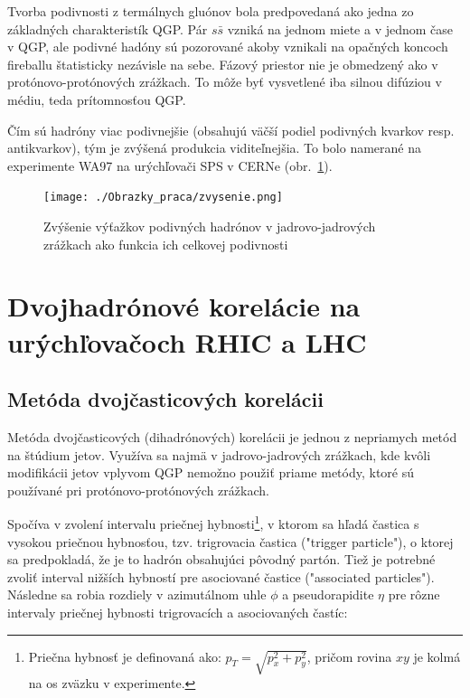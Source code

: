 \documentclass[thesismargins, thesislinespacing]{rnthesis}
\begin{document}
Tvorba podivnosti z termálnych gluónov bola predpovedaná ako jedna zo \-zák\-lad\-ných charakteristík QGP. Pár $s \bar{s}$ vzniká na jednom miete a v jednom čase v QGP, ale podivné hadóny sú pozorované akoby vznikali na opačných koncoch fireballu štatisticky nezávisle na sebe. Fázový priestor nie je obmedzený ako v protónovo-protónových zrážkach. To môže byť vysvetlené iba silnou difúziou v médiu, teda prítomnosťou QGP.

Čím sú hadróny viac podivnejšie (obsahujú väčší podiel podivných kvarkov resp. antikvarkov), tým je zvýšená produkcia viditeľnejšia. To bolo namerané na experimente WA97 na urýchľovači SPS v CERNe (obr.~\ref{zvysenie}).


\begin{figure}[hbtp!]
	\begin{center}
		\texttt{[image: ./Obrazky\_praca/zvysenie.png]}
		\caption{ Zvýšenie výťažkov podivných hadrónov v jadrovo-jadrových zrážkach ako funkcia ich celkovej podivnosti \cite{zvysenie}}
		\label{zvysenie}
	\end{center}
\end{figure}  



\chapter{Dvojhadrónové korelácie na urýchľovačoch RHIC a LHC}

\section{Metóda dvojčasticových korelácii}
Metóda dvojčasticových (dihadrónových) korelácii je jednou z nepriamych metód na štúdium jetov. Využíva sa najmä v jadrovo-jadrových zrážkach, kde kvôli \-mo\-di\-fi\-ká\-cii jetov vplyvom QGP nemožno použiť priame metódy, ktoré sú používané pri protónovo-protónových zrážkach.

Spočíva v zvolení intervalu priečnej hybnosti\footnote{Priečna hybnosť je definovaná ako: $p_T=\sqrt{p_x^2+p_y^2}$, pričom rovina $xy$ je kolmá na os zväzku v experimente.}, v ktorom sa hľadá častica s vysokou priečnou hybnosťou, tzv. trigrovacia častica ("trigger particle"), o ktorej sa predpokladá, že je to hadrón obsahujúci pôvodný partón. Tiež je potrebné zvoliť interval nižších hybností pre asociované častice ("\-associated particles"). Následne sa robia rozdiely v \-a\-zi\-mu\-tál\-nom uhle $\phi$ a pseudorapidite $\eta$ pre rôzne intervaly priečnej hybnosti trigrovacích a asociovaných častíc:
\end{document}
